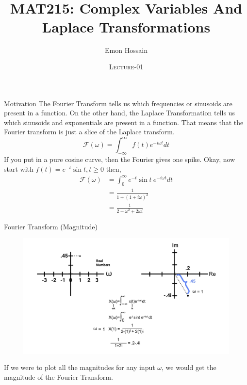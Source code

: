 \documentclass[11pt]{beamer}
\author[] %
{Emon Hossain\inst{1}}
\institute[University of Dhaka] %
{
  \inst{1}%
  Lecturer\\MNS department\\Brac University
}
\date[] %
{\textsc{Lecture-01}}
\title[]{MAT215: Complex Variables And Laplace Transformations}
\theoremstyle{plain}
\begin{document}
\begin{frame}
\titlepage
\end{frame}

\begin{frame}{Motivation}
    The Fourier Transform tells us which frequencies or sinusoids are present in a function. On the other hand, the Laplace Transformation tells us which sinusoids and exponentials are present in a function. That means that the Fourier transform is just a slice of the Laplace transform.   
    $$
    \mathcal F(\omega)=\int_{-\infty}^\infty f(t) e^{-i\omega t}dt
    $$
    If you put in a pure cosine curve, then the Fourier gives one spike. Okay, now start with $f(t)=e^{-t}\sin t, t\geq 0$ then, 
    \begin{align*}
        \mathcal F(\omega) &= \int_{0}^\infty e^{-t}\sin t\: e^{-i\omega t}dt\\
        &= \frac{1}{1+(1+i\omega)^2}\\
        &= \frac{1}{2-\omega^2+2\omega i}
    \end{align*} 
\end{frame}

\begin{frame}{Fourier Transform (Magnitude)}
    \begin{figure}
        \centering
        \includegraphics[width=\linewidth]{Laplace_01_graph.png}
    \end{figure}
    If we were to plot all the magnitudes for any input $\omega$, we would get the magnitude of the Fourier Transform.
\end{frame}
\end{document}
